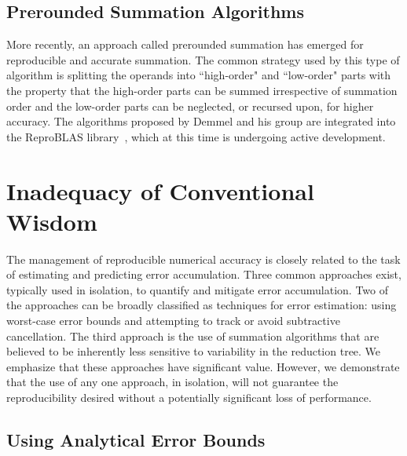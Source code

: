 \subsection{Prerounded Summation Algorithms}

More recently, an approach called prerounded summation has emerged for
reproducible and accurate summation.  The common strategy used by this
type of algorithm is splitting the operands into ``high-order" and
``low-order" parts with the property that the high-order parts can be
summed irrespective of summation order and the low-order parts can be
neglected, or recursed upon, for higher accuracy. The algorithms
proposed by Demmel and his group are integrated into the ReproBLAS
library~\cite{demmel}, which at this time is undergoing active
development.

\section{Inadequacy of Conventional Wisdom}

The management of reproducible numerical accuracy is closely related
to the task of estimating and predicting error accumulation.  Three
common approaches exist, typically used in isolation, to quantify and
mitigate error accumulation. Two of the approaches can be broadly
classified as techniques for error estimation: using worst-case error
bounds and attempting to track or avoid subtractive cancellation. The
third approach is the use of summation algorithms that are believed to
be inherently less sensitive to variability in the reduction tree.  We
emphasize that these approaches have significant value. However, we
demonstrate that the use of any one approach, in isolation, will not
guarantee the reproducibility desired without a potentially
significant loss of performance.

\subsection{Using Analytical Error Bounds}

